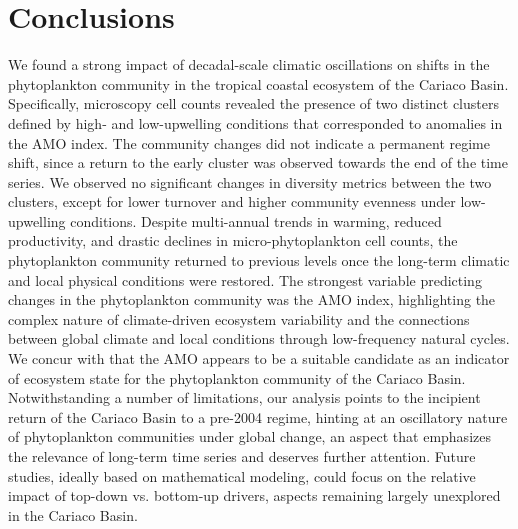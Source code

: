 \documentclass[draft]{agujournal2019}
\begin{document}
    

\section{Conclusions}
    We found a strong impact of decadal-scale climatic oscillations on shifts in the phytoplankton community in the tropical coastal ecosystem of the Cariaco Basin. Specifically, microscopy cell counts revealed the presence of two distinct clusters defined by high- and low-upwelling conditions that corresponded to anomalies in the AMO index. The community changes did not indicate a permanent regime shift, since a return to the early cluster was observed towards the end of the time series. We observed no significant changes in diversity metrics between the two clusters, except for lower turnover and higher community evenness under low-upwelling conditions.
    Despite multi-annual trends in warming, reduced productivity, and drastic declines in micro-phytoplankton cell counts, the phytoplankton community returned to previous levels once the long-term climatic and local physical conditions were restored. 
    The strongest variable predicting changes in the phytoplankton community was the AMO index, highlighting the complex nature of climate-driven ecosystem variability and the connections between global climate and local conditions through low-frequency natural cycles. We concur with  that the AMO appears to be a suitable candidate as an indicator of ecosystem state for the phytoplankton community of the Cariaco Basin. 
    Notwithstanding a number of limitations, our analysis points to the incipient return of the Cariaco Basin to a pre-2004 regime, hinting at an oscillatory nature of phytoplankton communities under global change, an aspect that emphasizes the relevance of long-term time series and deserves further attention. 
    Future studies, ideally based on mathematical modeling, could focus on the relative impact of top-down vs. bottom-up drivers,  aspects remaining largely unexplored in the Cariaco Basin.
    
    
    
    


\end{document}
